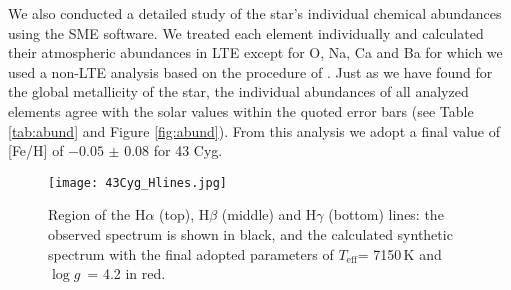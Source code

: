 \documentclass{aa}
\def\Teff{\ensuremath{T_{\mathrm{eff}}}}
\def\logg{\ensuremath{\log g}}
\begin{document}
We also conducted a detailed study of the star's individual chemical abundances using the SME software. We treated each element individually and calculated their atmospheric abundances in LTE except for O, Na, Ca and Ba for which we used a non-LTE analysis based on the procedure of \citet{piskunov2017nlte}. 
Just as we have found for the global metallicity of the star, the individual abundances of all analyzed elements agree with the solar values within the quoted error bars (see Table \ref{tab:abund} and Figure \ref{fig:abund}).
From this analysis we adopt a final value of [Fe/H] of $-0.05$ $\pm$ 0.08 for 43 Cyg.

\begin{figure}
	\begin{center}
	\texttt{[image: 43Cyg\_Hlines.jpg]}
    \caption{Region of the H$\alpha$ (top), H$\beta$ (middle) and H$\gamma$ (bottom) lines: the observed spectrum is shown in black, and the calculated synthetic spectrum with the final adopted parameters of \Teff = 7150\,K and \logg\ = 4.2 in red.}
    \label{fig:hlines}
	\end{center}
\end{figure}
\end{document}
